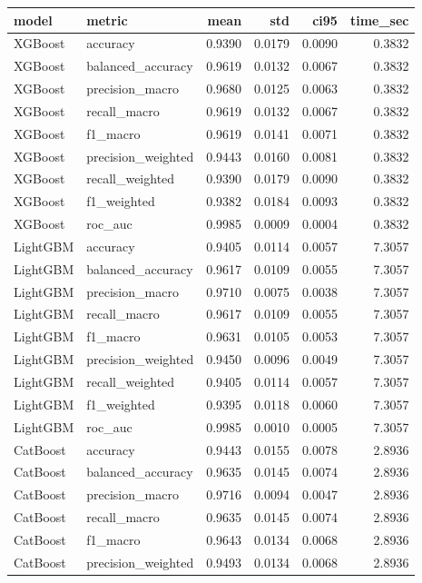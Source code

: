\begin{tabular}{llrrrr}
\toprule
model & metric & mean & std & ci95 & time_sec \\
\midrule
XGBoost & accuracy & 0.9390 & 0.0179 & 0.0090 & 0.3832 \\
XGBoost & balanced_accuracy & 0.9619 & 0.0132 & 0.0067 & 0.3832 \\
XGBoost & precision_macro & 0.9680 & 0.0125 & 0.0063 & 0.3832 \\
XGBoost & recall_macro & 0.9619 & 0.0132 & 0.0067 & 0.3832 \\
XGBoost & f1_macro & 0.9619 & 0.0141 & 0.0071 & 0.3832 \\
XGBoost & precision_weighted & 0.9443 & 0.0160 & 0.0081 & 0.3832 \\
XGBoost & recall_weighted & 0.9390 & 0.0179 & 0.0090 & 0.3832 \\
XGBoost & f1_weighted & 0.9382 & 0.0184 & 0.0093 & 0.3832 \\
XGBoost & roc_auc & 0.9985 & 0.0009 & 0.0004 & 0.3832 \\
LightGBM & accuracy & 0.9405 & 0.0114 & 0.0057 & 7.3057 \\
LightGBM & balanced_accuracy & 0.9617 & 0.0109 & 0.0055 & 7.3057 \\
LightGBM & precision_macro & 0.9710 & 0.0075 & 0.0038 & 7.3057 \\
LightGBM & recall_macro & 0.9617 & 0.0109 & 0.0055 & 7.3057 \\
LightGBM & f1_macro & 0.9631 & 0.0105 & 0.0053 & 7.3057 \\
LightGBM & precision_weighted & 0.9450 & 0.0096 & 0.0049 & 7.3057 \\
LightGBM & recall_weighted & 0.9405 & 0.0114 & 0.0057 & 7.3057 \\
LightGBM & f1_weighted & 0.9395 & 0.0118 & 0.0060 & 7.3057 \\
LightGBM & roc_auc & 0.9985 & 0.0010 & 0.0005 & 7.3057 \\
CatBoost & accuracy & 0.9443 & 0.0155 & 0.0078 & 2.8936 \\
CatBoost & balanced_accuracy & 0.9635 & 0.0145 & 0.0074 & 2.8936 \\
CatBoost & precision_macro & 0.9716 & 0.0094 & 0.0047 & 2.8936 \\
CatBoost & recall_macro & 0.9635 & 0.0145 & 0.0074 & 2.8936 \\
CatBoost & f1_macro & 0.9643 & 0.0134 & 0.0068 & 2.8936 \\
CatBoost & precision_weighted & 0.9493 & 0.0134 & 0.0068 & 2.8936 \\

\end{tabular}
